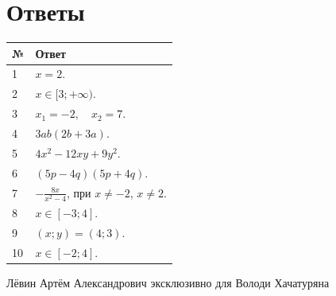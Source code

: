 \documentclass[a4paper,12pt]{article}
\begin{document}
\section*{Ответы}
\vspace{4mm}
\begin{center}
\renewcommand{\arraystretch}{1.5}
\begin{tabularx}{\linewidth}{@{}p{13mm}X@{}}
\toprule
№ & Ответ \\
\midrule
1 & \(x=2\).\\
2 & \(x\in[3;+\infty)\).\\
3 & \(x_1=-2,\quad x_2=7\).\\
4 & \(3ab(2b+3a)\).\\
5 & \(4x^2-12xy+9y^2\).\\
6 & \((5p-4q)(5p+4q)\).\\
7 & \(\displaystyle-\frac{8x}{x^2-4}\), при \(x\ne-2\), \(x\ne2\).\\
8 & \(x\in[-3;4]\).\\
9 & \((x;y)=(4;3)\).\\
10 & \(x\in[-2;4]\).\\
\bottomrule
\end{tabularx}
\end{center}
\vfill
\begin{center}
\small\color{softgray}Лёвин Артём Александрович эксклюзивно для Володи Хачатуряна
\end{center}
\end{document}
